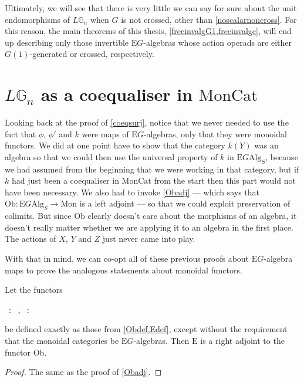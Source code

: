 Ultimately, we will see that there is very little we can say for sure about the unit endomorphisms of $L\mathbb{G}_n$ when $G$ is not crossed, other than \cref{noscalarnoncross}. For this reason, the main theorems of this thesis, \cref{freeinvalgG1,freeinvalgc}, will end up describing only those invertible $\mathrm{E}G$-algebras whose action operads are either $G(1)$-generated or crossed, respectively.

\section{$L\mathbb{G}_n$ as a coequaliser in $\mathrm{MonCat}$} \label{colimmoncat}

Looking back at the proof of \cref{coeqsurj}, notice that we never needed to use the fact that $\phi$, $\phi'$ and $k$ were maps of $\mathrm{E}G$-algebras, only that they were monoidal functors. We did at one point have to show that the category $k(Y)$ was an algebra so that we could then use the universal property of $k$ in $\mathrm{E}G\mathrm{Alg}_S$, because we had assumed from the beginning that we were working in that category, but if $k$ had just been a coequaliser in $\mathrm{MonCat}$ from the start then this part would not have been necessary. We also had to invoke \cref{Obadj} --- which says that $\mathrm{Ob}: \mathrm{E}G\mathrm{Alg}_S \to \mathrm{Mon}$ is a left adjoint --- so that we could exploit preservation of colimits. But since $\mathrm{Ob}$ clearly doesn't care about the morphisms of an algebra, it doesn't really matter whether we are applying it to an algebra in the first place. The actions of $X$, $Y$ and $Z$ just never came into play.

With that in mind, we can co-opt all of these previous proofs about $\mathrm{E}G$-algebra maps to prove the analogous statements about monoidal functors.

\begin{prop}\label{Obadjmon} Let the functors 
\begin{eq*}  \, : \,  \to {}, \quad \quad \quad {} \, : \,  \to {} \end{eq*}
be defined exactly as those from \cref{Obdef,Edef}, except without the requirement that the monoidal categories be $\mathrm{E}G$-algebras. Then $\mathrm{E}$ is a right adjoint to the functor $\mathrm{Ob}$. 
\end{prop}
\begin{proof}
The same as the proof of \cref{Obadj}.
\end{proof}

